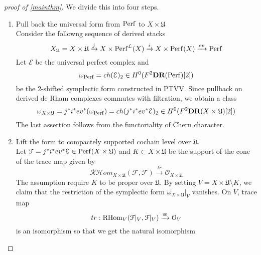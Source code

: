 \begin{proof}[proof of \ref{mainthm}]
    We divide this into four steps.
    \begin{enumerate}
        \item Pull back the universal form from $\mathrm{Perf}$ to $X \times \mathfrak{U}$\\
        Consider the followng sequence of derived stacks
        \begin{equation*}
            X_{\mathfrak{U}}=X \times \mathfrak{U} \xrightarrow{j} X \times \mathrm{Perf}^{\mathcal{L}}(X) \xrightarrow{i} X \times \mathrm{Perf}(X) \xrightarrow{ev} \mathrm{Perf}
        \end{equation*}
        Let $\mathcal{E}$ be the universal perfect complex and 
        \begin{equation*}
            \omega_{\mathrm{Perf}} = ch(\mathcal{E})_2 \in H^0(F^2\textbf{DR}(\mathrm{Perf})[2])
        \end{equation*}
        be the 2-shifted symplectic form constructed in PTVV. Since pullback on derived de Rham complexes commutes with filtration, we obtain a class 
        \begin{equation*}
            \omega_{X \times \mathfrak{U}}=j^*i^*ev^*(\omega_{\mathrm{Perf}}) =ch(j^*i^*ev^*\mathcal{E})_2 \in H^0(F^2\textbf{DR}(X \times \mathfrak{U})[2])
        \end{equation*}
        The last assertion follows from the functoriality of Chern character.
        \item Lift the form to compactely supported cochain level over $\mathfrak{U}$.\\
        Let $\mathcal{F}=j^*i^*ev^*\mathcal{E} \in \mathrm{Perf}(X \times \mathfrak{U})$ and $K \subset X \times \mathfrak{U}$ be the support of the cone of the trace map given by
        \begin{equation*}
            \mathcal{RH}om_{X \times \mathfrak{U}}(\mathcal{F}, \mathcal{F}) \xrightarrow{tr} \mathcal{O}_{X \times \mathfrak{U}}
        \end{equation*}The assumption require $K$ to be proper over $\mathfrak{U}$. By setting $V=X \times \mathfrak{U} \setminus K$, we claim that the restriction of the symplectic form $\omega_{X \times \mathfrak{U}}|_V$ vanishes. On $V$, trace map 
        \begin{equation*}
            tr: \operatorname{RHom}_V(\mathcal{F}|_V, \mathcal{F}|_V) \xrightarrow{\cong} \mathcal{O}_V
        \end{equation*}
        is an isomorphism so that we get the natural isomorphism 
        \begin{equation*}

\end{equation*}
\end{enumerate}
\end{proof}
